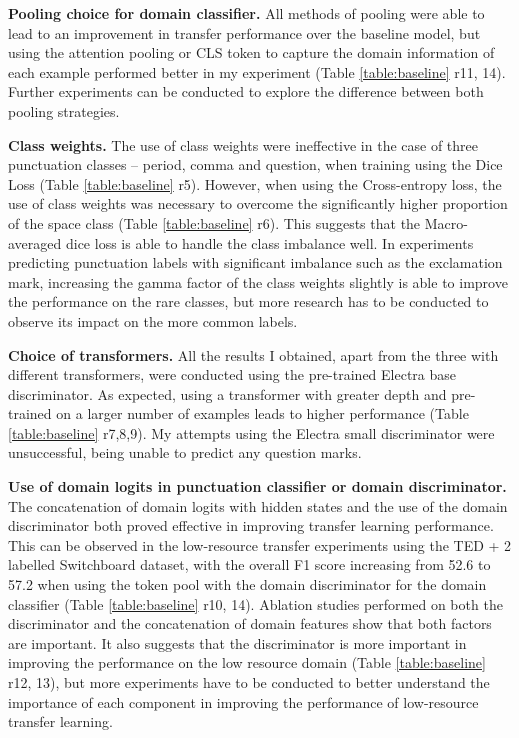 \documentclass[a4paper]{article}
\begin{document}
\begin{multicols}{2}
\textbf{Pooling choice for domain classifier.} All methods of pooling were able to lead to an improvement in transfer performance over the baseline model, but using the attention pooling or CLS token to capture the domain information of each example performed better in my experiment (Table \ref{table:baseline} r11, 14). Further experiments can be conducted to explore the difference between both pooling strategies.

\textbf{Class weights.} The use of class weights were ineffective in the case of three punctuation classes -- period, comma and question, when training using the Dice Loss (Table \ref{table:baseline} r5). However, when using the Cross-entropy loss, the use of class weights was necessary to overcome the significantly higher proportion of the space class (Table \ref{table:baseline} r6). This suggests that the Macro-averaged dice loss is able to handle the class imbalance well. In experiments predicting punctuation labels with significant imbalance such as the exclamation mark, increasing the gamma factor of the class weights slightly is able to improve the performance on the rare classes, but more research has to be conducted to observe its impact on the more common labels.

\textbf{Choice of transformers.} All the results I obtained, apart from the three with different transformers, were conducted using the pre-trained Electra base discriminator. As expected, using a transformer with greater depth and pre-trained on a larger number of examples leads to higher performance (Table \ref{table:baseline} r7,8,9). My attempts using the Electra small discriminator were unsuccessful, being unable to predict any question marks.

\textbf{Use of domain logits in punctuation classifier or domain discriminator.} The concatenation of domain logits with hidden states and the use of the domain discriminator both proved effective in improving transfer learning performance. This can be observed in the low-resource transfer experiments using the TED + 2 labelled Switchboard dataset, with the overall F1 score increasing from 52.6 to 57.2 when using the token pool with the domain discriminator for the domain classifier (Table \ref{table:baseline} r10, 14). Ablation studies performed on both the discriminator and the concatenation of domain features show that both factors are important. It also suggests that the discriminator is more important in improving the performance on the low resource domain (Table \ref{table:baseline} r12, 13), but more experiments have to be conducted to better understand the importance of each component in improving the performance of low-resource transfer learning.


\end{multicols}
\end{document}
